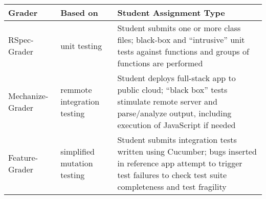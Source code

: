 \begin{tabular}{|p{}|p{}|p{}|}
 \hline
 \textbf{Grader} & \textbf{Based on} & \textbf{Student Assignment Type} \\
 \hline
 RSpec-Grader &
 unit testing &
 Student submits one or more class files; black-box and ``intrusive''
 unit tests against functions and groups of functions are performed
 \\
 Mechanize-Grader & 
 remmote integration testing &
 Student deploys full-stack app to public cloud; ``black box'' tests
 stimulate remote server and parse/analyze output, including execution
 of JavaScript if needed
 \\
 Feature-Grader &
 simplified mutation testing &
 Student submits integration tests written using Cucumber; bugs inserted
 in reference app attempt to trigger test failures to check test suite
 completeness and test fragility
 \\
 \hline
\end{tabular}
